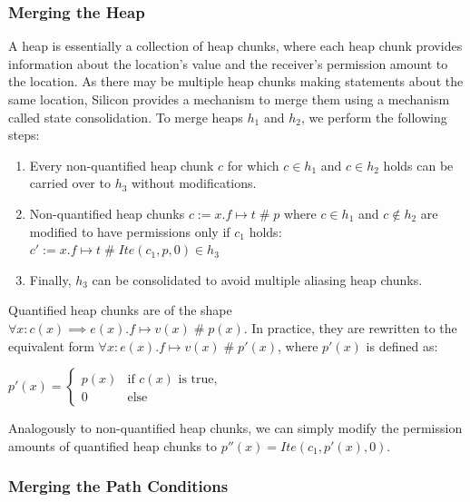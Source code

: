 \documentclass[11pt]{article}
\DeclareMathOperator{\perm}{\mathbin{\#}}
\begin{document}
    \subsubsection{Merging the Heap} \label{merging-the-heap}

    A heap is essentially a collection of heap chunks, where each heap chunk provides information
    about the location's value and the receiver's permission amount to the location.
    As there may be multiple heap chunks making statements about the same location,
    Silicon provides a mechanism to merge them using a mechanism called state consolidation.
    To merge heaps $h_1$ and $h_2$, we perform the following steps:

    \begin{enumerate}
        \item Every non-quantified heap chunk $c$ for which $c \in h_1$ and $c \in h_2$ holds can be carried over to $h_3$
            without modifications.
        \item Non-quantified heap chunks $c := x.f \mapsto t \perm p$ where $c \in h_1$ and $c \notin h_2$ are modified to
            have permissions only if $c_1$ holds: $c' := x.f \mapsto t \perm Ite(c_1, p, 0) \in h_3$
        \item Finally, $h_3$ can be consolidated to avoid multiple aliasing heap chunks.
    \end{enumerate}

    Quantified heap chunks are of the shape $\forall x: c(x) \implies e(x).f \mapsto v(x) \perm p(x)$.
    In practice, they are rewritten to the equivalent form $\forall x: e(x).f \mapsto v(x) \perm p'(x)$,
    where $p'(x)$ is defined as:

    \begin{math}
        p'(x) = \begin{cases}
            p(x) & \text{if } c(x) \text{ is true,} \\
            0 & \text{else}
        \end{cases}
    \end{math}

    Analogously to non-quantified heap chunks, we can simply modify the permission amounts of
    quantified heap chunks to $p''(x) = Ite(c_1, p'(x), 0)$.

    \subsubsection{Merging the Path Conditions}
\end{document}
